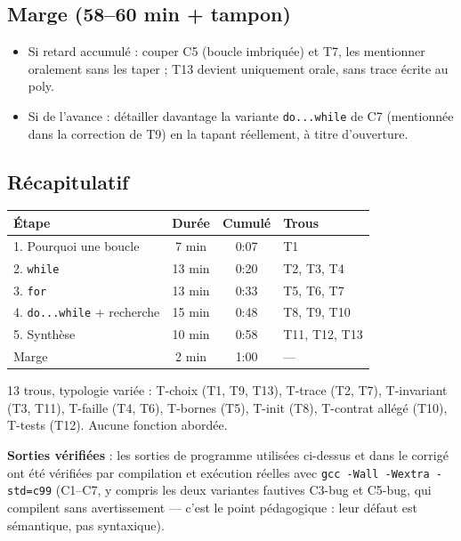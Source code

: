 \documentclass[cours, noCustomPackages]{UPSTI_Document}
\begin{document}
\TrouGrilleVerification

\subsection*{Marge (58--60 min + tampon)}

\begin{itemize}
	\item Si retard accumulé : couper C5 (boucle imbriquée) et T7, les
	mentionner oralement sans les taper ; T13 devient uniquement orale, sans
	trace écrite au poly.
	\item Si de l'avance : détailler davantage la variante \texttt{do...while}
	de C7 (mentionnée dans la correction de T9) en la tapant réellement, à
	titre d'ouverture.
\end{itemize}

\subsection*{Récapitulatif}

\begin{center}
\begin{tabular}{|l|c|c|l|}
\hline
\textbf{Étape} & \textbf{Durée} & \textbf{Cumulé} & \textbf{Trous} \\
\hline
1. Pourquoi une boucle & 7 min & 0:07 & T1 \\
\hline
2. \texttt{while} & 13 min & 0:20 & T2, T3, T4 \\
\hline
3. \texttt{for} & 13 min & 0:33 & T5, T6, T7 \\
\hline
4. \texttt{do...while} + recherche & 15 min & 0:48 & T8, T9, T10 \\
\hline
5. Synthèse & 10 min & 0:58 & T11, T12, T13 \\
\hline
Marge & 2 min & 1:00 & --- \\
\hline
\end{tabular}
\end{center}

13 trous, typologie variée : T-choix (T1, T9, T13), T-trace (T2, T7),
T-invariant (T3, T11), T-faille (T4, T6), T-bornes (T5), T-init (T8),
T-contrat allégé (T10), T-tests (T12). Aucune fonction abordée.

\textbf{Sorties vérifiées} : les sorties de programme utilisées ci-dessus et
dans le corrigé ont été vérifiées par compilation et exécution réelles avec
\texttt{gcc -Wall -Wextra -std=c99} (C1--C7, y compris les deux variantes
fautives C3-bug et C5-bug, qui compilent sans avertissement --- c'est le
point pédagogique : leur défaut est sémantique, pas syntaxique).
\end{document}
